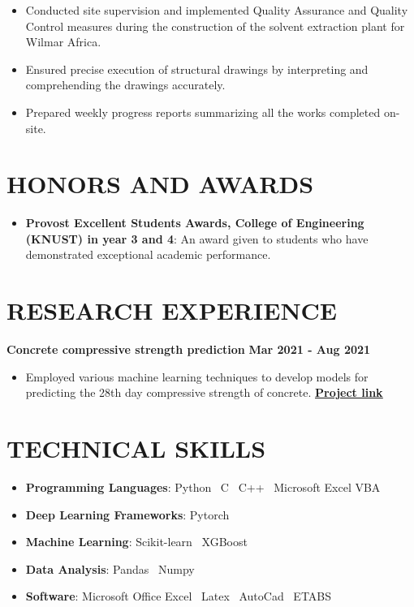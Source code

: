 \documentclass[letterpaper, 12pt]{article}
\newcommand{\cvsection}[1]{
	
	\section*{#1}
}
\begin{document}
	\begin{itemize}[leftmargin=*]
		
		\item Conducted site supervision and implemented Quality Assurance and Quality Control measures during the construction of the solvent extraction plant for Wilmar Africa.	
		\item Ensured precise execution of structural drawings by interpreting and comprehending the drawings accurately.
		\item Prepared weekly progress reports summarizing all the works completed on-site.
		
	\end{itemize}
	
	
	\cvsection{HONORS AND AWARDS}
	
	\begin{itemize}[leftmargin=*]
		
		\item \textbf{Provost Excellent Students Awards, College of Engineering (KNUST) in year 3 and 4}: An award given to students who have demonstrated exceptional academic performance.
		
	\end{itemize}
	
	
	\cvsection{RESEARCH EXPERIENCE}
	
	\textbf{Concrete compressive strength prediction} \hfill \textbf{Mar 2021 - Aug 2021}
	
	\begin{itemize}[leftmargin=*]
		
		\item Employed various machine learning techniques to develop models for predicting the 28th day compressive strength of concrete. \href{https://www.github.com/patrickboateng/compressive-strength-prediction}{\underline{\textbf{Project link}}}
		
	\end{itemize}
	
	
	\cvsection{TECHNICAL SKILLS}
	
	\begin{itemize}[leftmargin=*]
		
		\item \textbf{Programming Languages}: Python \vrule \, C \vrule \, C++ \vrule \, Microsoft Excel VBA
		\item \textbf{Deep Learning Frameworks}: Pytorch
		\item \textbf{Machine Learning}: Scikit-learn \vrule \, XGBoost
		\item \textbf{Data Analysis}: Pandas \vrule \, Numpy
		\item \textbf{Software}: Microsoft Office Excel \vrule \, Latex \vrule \, AutoCad \vrule \, ETABS
		
	\end{itemize}
	
\end{document}
